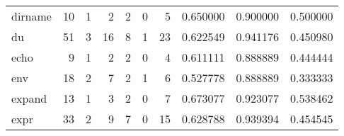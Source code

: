 \begin{tabular}{lrrrrrrrrr}
dirname   &                                      10 &                                                  1 &                                                  2 &                                                  2 &                                                  0 &                                                  5 &                                           0.650000 &                               0.900000 &                             0.500000 \\
du        &                                      51 &                                                  3 &                                                 16 &                                                  8 &                                                  1 &                                                 23 &                                           0.622549 &                               0.941176 &                             0.450980 \\
echo      &                                       9 &                                                  1 &                                                  2 &                                                  2 &                                                  0 &                                                  4 &                                           0.611111 &                               0.888889 &                             0.444444 \\
env       &                                      18 &                                                  2 &                                                  7 &                                                  2 &                                                  1 &                                                  6 &                                           0.527778 &                               0.888889 &                             0.333333 \\
expand    &                                      13 &                                                  1 &                                                  3 &                                                  2 &                                                  0 &                                                  7 &                                           0.673077 &                               0.923077 &                             0.538462 \\
expr      &                                      33 &                                                  2 &                                                  9 &                                                  7 &                                                  0 &                                                 15 &                                           0.628788 &                               0.939394 &                             0.454545 \\

\end{tabular}
